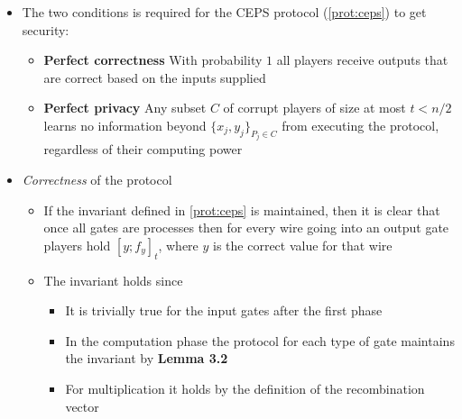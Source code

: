 \begin{itemize}
  \item The two conditions is required for the CEPS protocol (\autoref{prot:ceps}) to get security:
  \begin{itemize}
  	\item \textbf{Perfect correctness} With probability $1$ all players receive outputs that are correct based on the inputs supplied
  	\item \textbf{Perfect privacy} Any subset $C$ of corrupt players of size at most $t<n/2$ learns no information beyond $\{x_j,y_j\}_{P_j \in C}$ from executing the protocol, regardless of their computing power
  \end{itemize}
  
  \item \textit{Correctness} of the protocol
  \begin{itemize}
  	\item If the invariant defined in \autoref{prot:ceps} is maintained, then it is clear that once all gates are processes then for every wire going into an output gate players hold $[y;f_y]_t$, where $y$ is the correct value for that wire
    \item The invariant holds since
    \begin{itemize}
    	\item It is trivially true for the input gates after the first phase
      \item In the computation phase the protocol for each type of gate maintains the invariant by \textbf{Lemma 3.2}
      \item For multiplication it holds by the definition of the recombination vector
    \end{itemize}
  \end{itemize}


\end{itemize}

